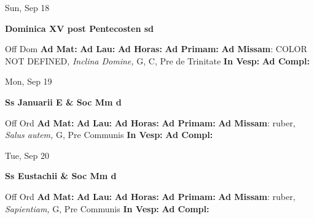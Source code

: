 \documentclass[10pt]{memoir}
\begin{document}
\begin{center}
\begin{minipage}{3.5in}
\vspace{2em}
\begin{center}Sun, Sep 18
\end{center}
\textbf{ \large Dominica XV post Pentecosten
\textnormal{\normalsize sd}}

\begin{justify}Off Dom
\textbf{Ad Mat: }
\textbf{Ad Lau: }
\textbf{Ad Horas: }
\textbf{Ad Primam: }\textbf{Ad Missam}: COLOR NOT DEFINED, \textit{Inclina Domine,} G, C, Pre de Trinitate
\textbf{In Vesp: }
\textbf{Ad Compl: }
\end{justify}
\end{minipage}
\end{center}

\begin{center}
\begin{minipage}{3.5in}
\vspace{2em}
\begin{center}Mon, Sep 19
\end{center}
\textbf{ \large Ss Januarii E \& Soc Mm
\textnormal{\normalsize d}}

\begin{justify}Off Ord
\textbf{Ad Mat: }
\textbf{Ad Lau: }
\textbf{Ad Horas: }
\textbf{Ad Primam: }\textbf{Ad Missam}: ruber, \textit{Salus autem,} G, Pre Communis
\textbf{In Vesp: }
\textbf{Ad Compl: }
\end{justify}
\end{minipage}
\end{center}

\begin{center}
\begin{minipage}{3.5in}
\vspace{2em}
\begin{center}Tue, Sep 20
\end{center}
\textbf{ \large Ss Eustachii \& Soc Mm
\textnormal{\normalsize d}}

\begin{justify}Off Ord
\textbf{Ad Mat: }
\textbf{Ad Lau: }
\textbf{Ad Horas: }
\textbf{Ad Primam: }\textbf{Ad Missam}: ruber, \textit{Sapientiam,} G, Pre Communis
\textbf{In Vesp: }
\textbf{Ad Compl: }
\end{justify}
\end{minipage}
\end{center}
\end{document}
